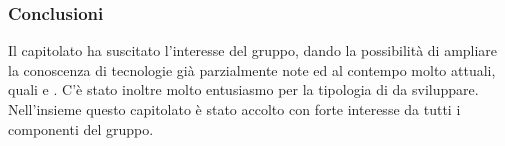 	\subsubsection{Conclusioni}
	Il capitolato ha suscitato l'interesse del gruppo, dando la possibilità di ampliare la conoscenza di tecnologie già parzialmente note ed al contempo molto attuali, quali  e . C'è stato inoltre molto entusiasmo per la tipologia di  da sviluppare. Nell'insieme questo capitolato è stato accolto con forte interesse da tutti i componenti del gruppo.
